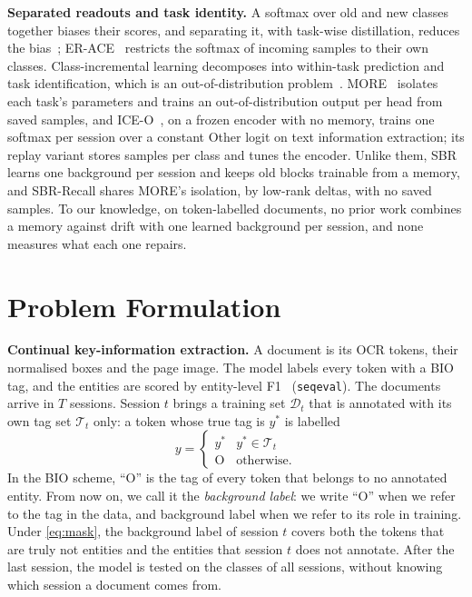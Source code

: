 \documentclass[10pt,twocolumn,letterpaper]{article}
\newcommand{\runin}[1]{\par\addvspace{0.7ex plus .3ex minus .1ex}\noindent\textbf{#1}\hspace{1em}\ignorespaces}
\begin{document}
\runin{Separated readouts and task identity.} A softmax over old and new classes together biases their scores, and separating it, with task-wise distillation, reduces the bias~\citep{ahn2021ssil}; ER-ACE~\citep{caccia2022erace} restricts the softmax of incoming samples to their own classes. Class-incremental learning decomposes into within-task prediction and task identification, which is an out-of-distribution problem~\citep{kim2022theoretical}. MORE~\citep{kim2022more} isolates each task's parameters and trains an out-of-distribution output per head from saved samples, and ICE-O~\citep{liu2023ice}, on a frozen encoder with no memory, trains one softmax per session over a constant Other logit on text information extraction; its replay variant stores samples per class and tunes the encoder. Unlike them, SBR learns one background per session and keeps old blocks trainable from a memory, and SBR-Recall shares MORE's isolation, by low-rank deltas, with no saved samples. To our knowledge, on token-labelled documents, no prior work combines a memory against drift with one learned background per session, and none measures what each one repairs.

\section{Problem Formulation}
\label{sec:setup}
\runin{Continual key-information extraction.} A document is its OCR tokens, their normalised boxes and the page image. The model labels every token with a BIO tag, and the entities are scored by entity-level F1~\citep{tjong2003conll} (\texttt{seqeval}). The documents arrive in $T$ sessions. Session $t$ brings a training set $\mathcal{D}_t$ that is annotated with its own tag set $\mathcal{T}_t$ only: a token whose true tag is $y^{\ast}$ is labelled
\begin{equation}
y=\begin{cases} y^{\ast} & y^{\ast}\in\mathcal{T}_t\\ \mathrm{O} & \text{otherwise.}\end{cases}
\label{eq:mask}
\end{equation}
In the BIO scheme, ``O'' is the tag of every token that belongs to no annotated entity. From now on, we call it the \emph{background label}: we write ``O'' when we refer to the tag in the data, and background label when we refer to its role in training. Under \cref{eq:mask}, the background label of session $t$ covers both the tokens that are truly not entities and the entities that session $t$ does not annotate. After the last session, the model is tested on the classes of all sessions, without knowing which session a document comes from.
\end{document}
